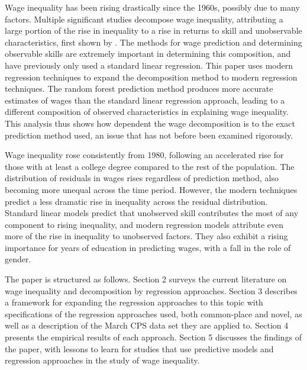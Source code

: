 \documentclass[notitlepage,12pt]{article}
\begin{document}
Wage inequality has been rising drastically since the 1960s, possibly due to many factors.  Multiple significant studies decompose wage inequality, attributing a large portion of the rise in inequality to a rise in returns to skill and unobservable characteristics, first shown by \cite{juhn1993wage}.  The methods for wage prediction and determining observable skills are extremely important in determining this composition, and have previously only used a standard linear regression.  This paper uses modern regression techniques to expand the \cite{juhn1993wage} decomposition method to modern regression techniques.  The random forest prediction method produces more accurate estimates of wages than the standard linear regression approach, leading to a different composition of observed characteristics in explaining wage inequality.  This analysis thus shows how dependent the wage decomposition is to the exact prediction method used, an issue that has not before been examined rigorously. 

Wage inequality rose consistently from 1980, following an accelerated rise for those with at least a college degree compared to the rest of the population.  The distribution of residuals in wages rises regardless of prediction method, also becoming more unequal across the time period.  However, the modern techniques predict a less dramatic rise in inequality across the residual distribution.  Standard linear models predict that unobserved skill contributes the most of any component to rising inequality, and modern regression models attribute even more of the rise in inequality to unobserved factors.  They also exhibit a rising importance for years of education in predicting wages, with a fall in the role of gender.

The paper is structured as follows.  Section 2 surveys the current literature on wage inequality and decomposition by regression approaches.  Section 3 describes a framework for expanding the regression approaches to this topic with specifications of the regression approaches used, both common-place and novel, as well as a description of the March CPS data set they are applied to.  Section 4 presents the empirical results of each approach.  Section 5 discusses the findings of the paper, with lessons to learn for studies that use predictive models and regression approaches in the study of wage inequality.

\end{document}
